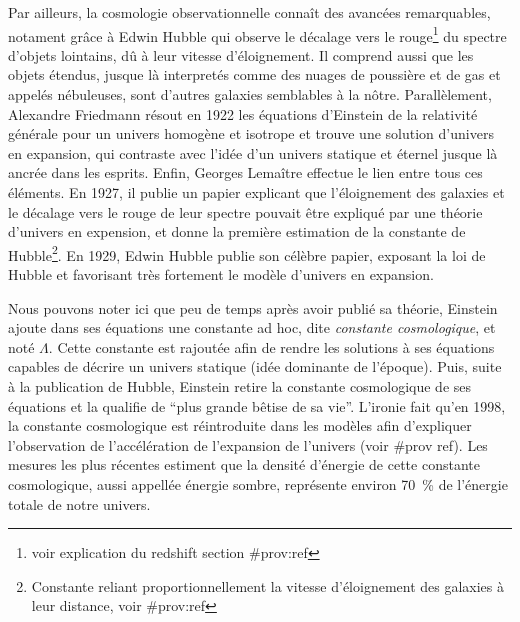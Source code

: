 \documentclass[11pt, twoside, a4paper, openright]{report}
\begin{document}
Par ailleurs, la cosmologie observationnelle connaît des avancées remarquables, notament grâce à Edwin Hubble qui observe le décalage vers le rouge\footnote{voir explication du redshift section \#prov:ref} du spectre d'objets lointains, dû à leur vitesse d'éloignement. Il comprend aussi que les objets étendus, jusque là interpretés comme des nuages de poussière et de gas et appelés nébuleuses, sont d'autres galaxies semblables à la nôtre. Parallèlement, Alexandre Friedmann résout en 1922 les équations d'Einstein de la relativité générale pour un univers homogène et isotrope et trouve une solution d'univers en expansion, qui contraste avec l'idée d'un univers statique et éternel jusque là ancrée dans les esprits. Enfin, Georges Lemaître effectue le lien entre tous ces éléments. En 1927, il publie un papier explicant que l'éloignement des galaxies et le décalage vers le rouge de leur spectre pouvait être expliqué par une théorie d'univers en expension, et donne la première estimation de la constante de Hubble\footnote{Constante reliant proportionnellement la vitesse d'éloignement des galaxies à leur distance, voir \#prov:ref}. En 1929, Edwin Hubble publie son célèbre papier, exposant la loi de Hubble et favorisant très fortement le modèle d'univers en expansion.

Nous pouvons noter ici que peu de temps après avoir publié sa théorie, Einstein ajoute dans ses équations une constante ad hoc, dite \emph{constante cosmologique}, et noté $\Lambda$. Cette constante est rajoutée afin de rendre les solutions à ses équations capables de décrire un univers statique (idée dominante de l'époque). Puis, suite à la publication de Hubble, Einstein retire la constante cosmologique de ses équations et la qualifie de ``plus grande bêtise de sa vie''. L'ironie fait qu'en 1998, la constante cosmologique est réintroduite dans les modèles afin d'expliquer l'observation de l'accélération de l'expansion de l'univers (voir \#prov ref). Les mesures les plus récentes estiment que la densité d'énergie de cette constante cosmologique, aussi appellée énergie sombre, représente environ \SI{70}{\percent} de l'énergie totale de notre univers.
\end{document}
